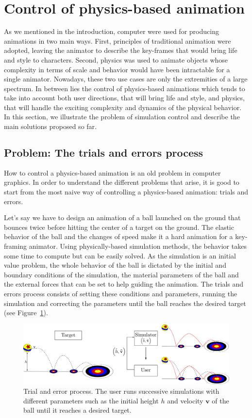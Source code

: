 \section{Control of physics-based animation}
\label{sec:starSimulationControl}

As we mentioned in the introduction, computer were used for producing animations in two main ways. 
First, principles of traditional animation were adopted, leaving the animator to describe the key-frames that would bring life and style to characters. 
Second, physics was used to animate objects whose complexity in terms of scale and behavior would have been intractable for a single animator. 
Nowadays, these two use cases are only the extremities of a large spectrum. 
In between lies the control of physics-based animations which tends to take into account both user directions, that will bring life and style, and physics, that will handle the exciting complexity and dynamics of the physical behavior.
In this section, we illustrate the problem of simulation control and describe the main solutions proposed so far.
\subsection{Problem: The trials and errors process}
How to control a physics-based animation is an old problem in computer graphics. In order to understand the different problems that arise, it is good to start from the most naive way of controlling a physics-based animation: trials and errors. 

Let's say we have to design an animation of a ball launched on the ground that bounces twice before hitting the center of a target on the ground. 
The elastic behavior of the ball and the changes of speed make it a hard animation for a key-framing animator. 
Using physically-based simulation methods, the behavior takes some time to compute but can be easily solved.
As the simulation is an initial value problem, the whole behavior of the ball is dictated by the initial and boundary conditions of the simulation, the material parameters of the ball and the external forces that can be set to help guiding the animation. 
The trials and errors process consists of setting these conditions and parameters, running the simulation and correcting the parameters until the ball reaches the desired target (see Figure~\ref{fig:trialErrorProcess}). 
\begin{figure}[!h]
	\centering
	\includegraphics[width=\linewidth]{./images/simulationControl/trialError.png}
	\caption[STAR control: Trial and error process]{\label{fig:trialErrorProcess}Trial and error process. 
	The user runs successive simulations with different parameters such as the initial height $h$ and velocity $\mathbf{v}$ of the ball until it reaches a desired target.}
\end{figure}

